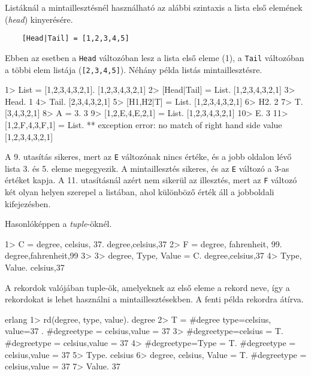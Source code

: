\documentclass[12pt, a4paper, oneside]{book}
\begin{document}
Listáknál a mintaillesztésnél használható az alábbi szintaxis a lista első
elemének (\emph{head}) kinyerésére.

\begin{verbatim}
    [Head|Tail] = [1,2,3,4,5]
\end{verbatim}

\noindent Ebben az esetben a \texttt{Head} változóban lesz a lista első eleme (1), a
\texttt{Tail} változóban a többi elem listája (\texttt{[2,3,4,5]}). Néhány
példa listás mintaillesztésre.

\begin{code}{}{}
1> List = [1,2,3,4,3,2,1].
[1,2,3,4,3,2,1]
2> [Head|Tail] = List.
[1,2,3,4,3,2,1]
3> Head.
1
4> Tail.
[2,3,4,3,2,1]
5> [H1,H2|T] = List.
[1,2,3,4,3,2,1]
6> H2.
2
7> T.
[3,4,3,2,1]
8> A = 3.
3
9> [1,2,E,4,E,2,1] = List. 
[1,2,3,4,3,2,1]
10> E.
3
11> [1,2,F,4,3,F,1] = List.
** exception error: no match of right hand 
side value [1,2,3,4,3,2,1]
\end{code}

\noindent A 9. utasítás sikeres, mert az \texttt{E} változónak nincs értéke, és
a jobb oldalon lévő lista 3. és 5. eleme megegyezik. A mintaillesztés sikeres,
és az \texttt{E} változó a 3-as értéket kapja. A 11. utasításnál azért nem
sikerül az illesztés, mert az \texttt{F} változó két olyan helyen szerepel a
listában, ahol különböző érték áll a jobboldali kifejezésben.

\noindent Hasonlóképpen a \emph{tuple}-öknél.

\begin{code}{}{}
1> C = {degree, celsius, 37}.
{degree,celsius,37}
2> F = {degree, fahrenheit, 99}.
{degree,fahrenheit,99}
3> 
3> {degree, Type, Value} = C.
{degree,celsius,37}
4> {Type, Value}.
{celsius,37}
\end{code}

\noindent A rekordok valójában tuple-ök, amelyeknek az első eleme a rekord
neve, így a rekordokat is lehet használni a mintaillesztésekben. A fenti példa
rekordra átírva.

\begin{code}{erlang}{}
1> rd(degree, { type, value}).
degree
2> T = #degree{ type=celsius, value=37 }.
#degree{type = celsius,value = 37}
3> #degree{type=celsius} = T.
#degree{type = celsius,value = 37}
4> #degree{type=Type} = T.   
#degree{type = celsius,value = 37}
5> Type.
celsius
6> {degree, celsius, Value} = T.
#degree{type = celsius,value = 37}
7> Value.
37
\end{code}
\end{document}
